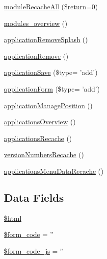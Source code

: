 \begin{DoxyCompactItemize}
\item 
\hyperlink{classadmin__core__applications__applications_ad2bdeb05c768798c7c9f6fcc0a4ae003}{module\-Recache\-All} (\$return=0)
\item 
\hyperlink{classadmin__core__applications__applications_a0f5ed2bce8cc0a3038915b6efe9273fc}{modules\-\_\-overview} ()
\item 
\hyperlink{classadmin__core__applications__applications_a80c73813d901628f148c3b43528d8c18}{application\-Remove\-Splash} ()
\item 
\hyperlink{classadmin__core__applications__applications_ac9985720450e916e0eea2d1553b4d90d}{application\-Remove} ()
\item 
\hyperlink{classadmin__core__applications__applications_a0db1d0999ee58360c5827e2dcfedfb43}{application\-Save} (\$type= 'add')
\item 
\hyperlink{classadmin__core__applications__applications_a184255c0fff4b4523d0c6a77aefe17a9}{application\-Form} (\$type= 'add')
\item 
\hyperlink{classadmin__core__applications__applications_a1a07b7d003ae5957008269d133a00212}{application\-Manage\-Position} ()
\item 
\hyperlink{classadmin__core__applications__applications_a5d9f28f6689c1c6343a461e8e425ec36}{applications\-Overview} ()
\item 
\hyperlink{classadmin__core__applications__applications_a8ecd3abbeeae23c09174868e3e194376}{applications\-Recache} ()
\item 
\hyperlink{classadmin__core__applications__applications_a5ffd14b66efd2b978b8f4901de153510}{version\-Numbers\-Recache} ()
\item 
\hyperlink{classadmin__core__applications__applications_a84e4db0ce930af75892713dbb7ea3891}{applications\-Menu\-Data\-Recache} ()
\end{DoxyCompactItemize}
\subsection*{Data Fields}
\begin{DoxyCompactItemize}
\item 
\hyperlink{classadmin__core__applications__applications_a6f96e7fc92441776c9d1cd3386663b40}{\$html}
\item 
\hyperlink{classadmin__core__applications__applications_af28aee726fa3eb6c355d08a2ab655e03}{\$form\-\_\-code} = ''
\item 
\hyperlink{classadmin__core__applications__applications_ac68fe8a02a2efd63c3271179f4b4fbb7}{\$form\-\_\-code\-\_\-js} = ''
\end{DoxyCompactItemize}
